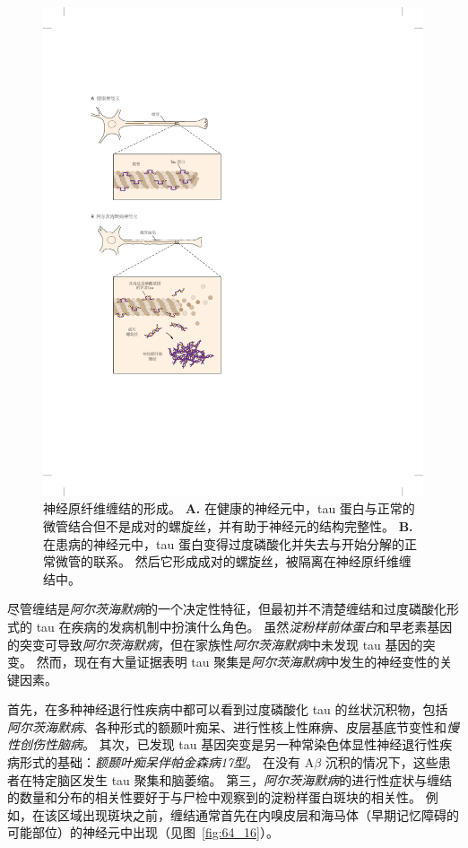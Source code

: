 \begin{figure}[htbp]
	\centering
	\includegraphics[width=0.7\linewidth]{chap64/fig_64_13}
	\caption{神经原纤维缠结的形成。
		\textbf{A.} 在健康的神经元中，tau 蛋白与正常的微管结合但不是成对的螺旋丝，并有助于神经元的结构完整性。
		\textbf{B.} 在患病的神经元中，tau 蛋白变得过度磷酸化并失去与开始分解的正常微管的联系。
		然后它形成成对的螺旋丝，被隔离在神经原纤维缠结中。}
	\label{fig:64_13}
\end{figure}


尽管缠结是\textit{阿尔茨海默病}的一个决定性特征，但最初并不清楚缠结和过度磷酸化形式的 tau 在疾病的发病机制中扮演什么角色。
虽然\textit{淀粉样前体蛋白}和早老素基因的突变可导致\textit{阿尔茨海默病}，但在家族性\textit{阿尔茨海默病}中未发现 tau 基因的突变。
然而，现在有大量证据表明 tau 聚集是\textit{阿尔茨海默病}中发生的神经变性的关键因素。


首先，在多种神经退行性疾病中都可以看到过度磷酸化 tau 的丝状沉积物，包括\textit{阿尔茨海默病}、各种形式的额颞叶痴呆、进行性核上性麻痹、皮层基底节变性和\textit{慢性创伤性脑病}。
其次，已发现 tau 基因突变是另一种常染色体显性神经退行性疾病形式的基础：\textit{额颞叶痴呆伴帕金森病17型}。
在没有 A$\beta$ 沉积的情况下，这些患者在特定脑区发生 tau 聚集和脑萎缩。
第三，\textit{阿尔茨海默病}的进行性症状与缠结的数量和分布的相关性要好于与尸检中观察到的淀粉样蛋白斑块的相关性。
例如，在该区域出现斑块之前，缠结通常首先在内嗅皮层和海马体（早期记忆障碍的可能部位）的神经元中出现（见图~\ref{fig:64_16}）。


